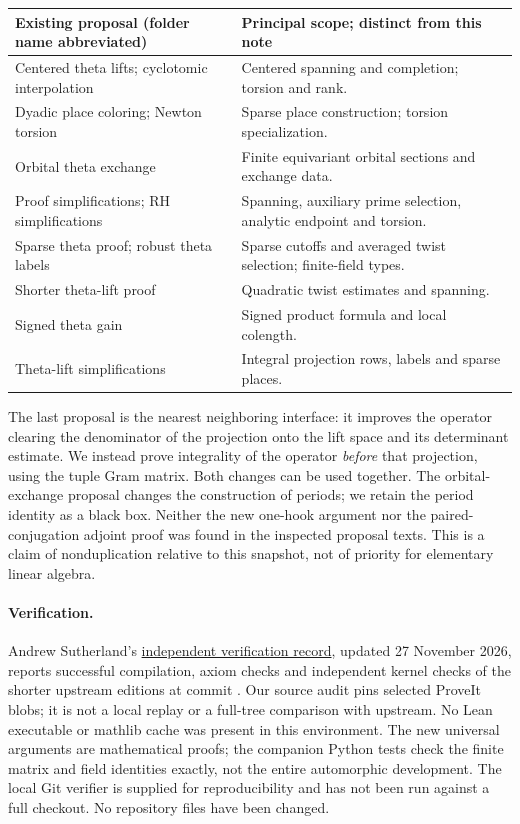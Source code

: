 \documentclass[11pt]{article}
\theoremstyle{remark}\newtheorem{remark}[theorem]{Remark}
\newcommand{\code}[1]{\texttt{\detokenize{#1}}}
\begin{document}
\begin{center}\small
\begin{tabularx}{\linewidth}{@{}p{.43\linewidth}X@{}}
\toprule
Existing proposal (folder name abbreviated) & Principal scope; distinct from this note\\
\midrule
Centered theta lifts; cyclotomic interpolation & Centered spanning and completion; torsion and rank.\\
Dyadic place coloring; Newton torsion & Sparse place construction; torsion specialization.\\
Orbital theta exchange & Finite equivariant orbital sections and exchange data.\\
Proof simplifications; RH simplifications & Spanning, auxiliary prime selection, analytic endpoint and torsion.\\
Sparse theta proof; robust theta labels & Sparse cutoffs and averaged twist selection; finite-field types.\\
Shorter theta-lift proof & Quadratic twist estimates and spanning.\\
Signed theta gain & Signed product formula and local colength.\\
Theta-lift simplifications & Integral projection rows, labels and sparse places.\\
\bottomrule
\end{tabularx}
\end{center}
The last proposal is the nearest neighboring interface: it improves the operator clearing the denominator of the projection onto the lift space and its determinant estimate. We instead prove integrality of the operator \emph{before} that projection, using the tuple Gram matrix. Both changes can be used together. The orbital-exchange proposal changes the construction of periods; we retain the period identity as a black box. Neither the new one-hook argument nor the paired-conjugation adjoint proof was found in the inspected proposal texts. This is a claim of nonduplication relative to this snapshot, not of priority for elementary linear algebra.

\paragraph{Verification.} Andrew Sutherland's \href{https://math.mit.edu/~drew/shortgrh/}{independent verification record}, updated 27 November 2026, reports successful compilation, axiom checks and independent kernel checks of the shorter upstream editions at commit \code{72fead102f663d5c7a407964a13dc0cf9d977207}. Our source audit pins selected ProveIt blobs; it is not a local replay or a full-tree comparison with upstream. No Lean executable or mathlib cache was present in this environment. The new universal arguments are mathematical proofs; the companion Python tests check the finite matrix and field identities exactly, not the entire automorphic development. The local Git verifier is supplied for reproducibility and has not been run against a full checkout. No repository files have been changed.
\end{document}
